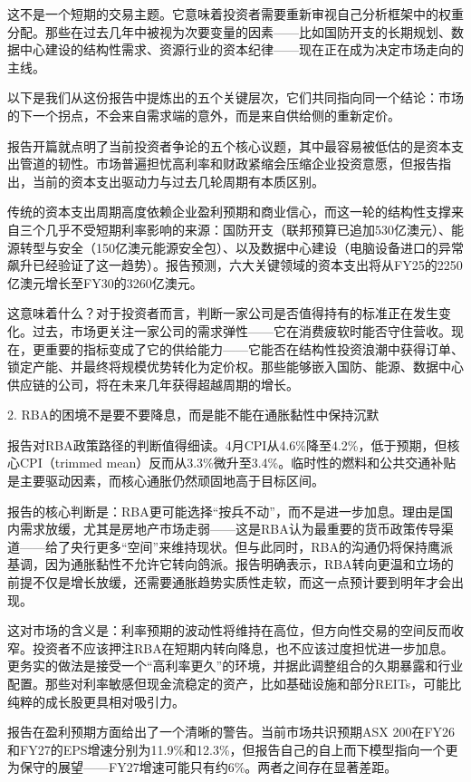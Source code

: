 \documentclass[11pt]{ctexart}
\begin{document}
这不是一个短期的交易主题。它意味着投资者需要重新审视自己分析框架中的权重分配。那些在过去几年中被视为次要变量的因素——比如国防开支的长期规划、数据中心建设的结构性需求、资源行业的资本纪律——现在正在成为决定市场走向的主线。

以下是我们从这份报告中提炼出的五个关键层次，它们共同指向同一个结论：市场的下一个拐点，不会来自需求端的意外，而是来自供给侧的重新定价。

报告开篇就点明了当前投资者争论的五个核心议题，其中最容易被低估的是资本支出管道的韧性。市场普遍担忧高利率和财政紧缩会压缩企业投资意愿，但报告指出，当前的资本支出驱动力与过去几轮周期有本质区别。

传统的资本支出周期高度依赖企业盈利预期和商业信心，而这一轮的结构性支撑来自三个几乎不受短期利率影响的来源：国防开支（联邦预算已追加530亿澳元）、能源转型与安全（150亿澳元能源安全包）、以及数据中心建设（电脑设备进口的异常飙升已经验证了这一趋势）。报告预测，六大关键领域的资本支出将从FY25的2250亿澳元增长至FY30的3260亿澳元。

这意味着什么？对于投资者而言，判断一家公司是否值得持有的标准正在发生变化。过去，市场更关注一家公司的需求弹性——它在消费疲软时能否守住营收。现在，更重要的指标变成了它的供给能力——它能否在结构性投资浪潮中获得订单、锁定产能、并最终将规模优势转化为定价权。那些能够嵌入国防、能源、数据中心供应链的公司，将在未来几年获得超越周期的增长。

2. RBA的困境不是要不要降息，而是能不能在通胀黏性中保持沉默

报告对RBA政策路径的判断值得细读。4月CPI从4.6\%降至4.2\%，低于预期，但核心CPI（trimmed mean）反而从3.3\%微升至3.4\%。临时性的燃料和公共交通补贴是主要驱动因素，而核心通胀仍然顽固地高于目标区间。

报告的核心判断是：RBA更可能选择“按兵不动”，而不是进一步加息。理由是国内需求放缓，尤其是房地产市场走弱——这是RBA认为最重要的货币政策传导渠道——给了央行更多“空间”来维持现状。但与此同时，RBA的沟通仍将保持鹰派基调，因为通胀黏性不允许它转向鸽派。报告明确表示，RBA转向更温和立场的前提不仅是增长放缓，还需要通胀趋势实质性走软，而这一点预计要到明年才会出现。

这对市场的含义是：利率预期的波动性将维持在高位，但方向性交易的空间反而收窄。投资者不应该押注RBA在短期内转向降息，也不应该过度担忧进一步加息。更务实的做法是接受一个“高利率更久”的环境，并据此调整组合的久期暴露和行业配置。那些对利率敏感但现金流稳定的资产，比如基础设施和部分REITs，可能比纯粹的成长股更具相对吸引力。

报告在盈利预期方面给出了一个清晰的警告。当前市场共识预期ASX 200在FY26和FY27的EPS增速分别为11.9\%和12.3\%，但报告自己的自上而下模型指向一个更为保守的展望——FY27增速可能只有约6\%。两者之间存在显著差距。
\end{document}

